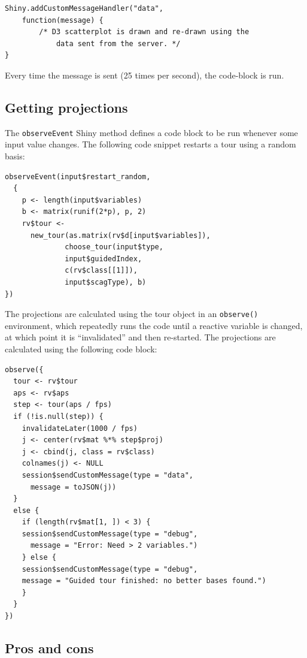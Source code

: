 \begin{verbatim}
Shiny.addCustomMessageHandler("data",
    function(message) {
        /* D3 scatterplot is drawn and re-drawn using the
            data sent from the server. */
}
\end{verbatim}

Every time the message is sent (25 times per second), the code-block is
run.

\subsection{Getting projections}\label{getting-projections}

The \texttt{observeEvent} Shiny method defines a code block to be run
whenever some input value changes. The following code snippet restarts a
tour using a random basis:

\begin{verbatim}
observeEvent(input$restart_random,
  {
    p <- length(input$variables)
    b <- matrix(runif(2*p), p, 2)
    rv$tour <- 
      new_tour(as.matrix(rv$d[input$variables]),
              choose_tour(input$type, 
              input$guidedIndex,
              c(rv$class[[1]]), 
              input$scagType), b)
})
\end{verbatim}

The projections are calculated using the tour object in an
\texttt{observe()} environment, which repeatedly runs the code until a
reactive variable is changed, at which point it is ``invalidated'' and
then re-started. The projections are calculated using the following code
block:

\begin{verbatim}
observe({
  tour <- rv$tour
  aps <- rv$aps
  step <- tour(aps / fps)
  if (!is.null(step)) {
    invalidateLater(1000 / fps)
    j <- center(rv$mat %*% step$proj)
    j <- cbind(j, class = rv$class)
    colnames(j) <- NULL
    session$sendCustomMessage(type = "data", 
      message = toJSON(j))
  }
  else {
    if (length(rv$mat[1, ]) < 3) {
    session$sendCustomMessage(type = "debug", 
      message = "Error: Need > 2 variables.")
    } else {
    session$sendCustomMessage(type = "debug", 
    message = "Guided tour finished: no better bases found.")
    }
  }
})
\end{verbatim}

\subsection{Pros and cons}\label{pros-and-cons}

